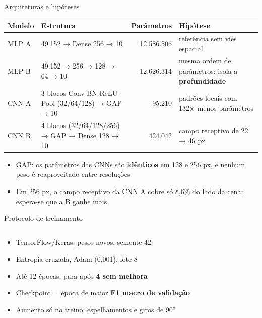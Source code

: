 \documentclass[aspectratio=169,10pt,t]{beamer}
\begin{document}
\begin{frame}{Arquiteturas e hipóteses}
\small
\begin{tabularx}{\linewidth}{@{}lLrL@{}}
\toprule
Modelo & Estrutura & Parâmetros & Hipótese\\
\midrule
MLP A & 49.152 → Dense 256 → 10 & 12.586.506 & referência sem viés espacial\\
MLP B & 49.152 → 256 → 128 → 64 → 10 & 12.626.314 & mesma ordem de parâmetros: isola a \textbf{profundidade}\\
CNN A & 3 blocos Conv-BN-ReLU-Pool (32/64/128) → GAP → 10 & 95.210 & padrões locais com 132× menos parâmetros\\
CNN B & 4 blocos (32/64/128/256) → GAP → Dense 128 → 10 & 424.042 & campo receptivo de 22 → 46 px\\
\bottomrule
\end{tabularx}
\vskip4mm
\begin{itemize}
\item GAP: os parâmetros das CNNs são \textbf{idênticos} em 128 e 256 px, e nenhum peso é reaproveitado entre resoluções
\item Em 256 px, o campo receptivo da CNN A cobre só 8,6\% do lado da cena; espera-se que a B ganhe mais
\end{itemize}
\end{frame}

\begin{frame}{Protocolo de treinamento}
\begin{columns}[T]
\begin{column}{0.5\textwidth}
\begin{itemize}
\item TensorFlow/Keras, pesos novos, semente 42
\item Entropia cruzada, Adam (0,001), lote 8
\item Até 12 épocas; para após \textbf{4 sem melhora}
\item Checkpoint = época de maior \textbf{F1 macro de validação}
\item Aumento só no treino: espelhamentos e giros de 90°
\end{itemize}
\end{column}
\begin{column}{0.46\textwidth}
\vskip3mm
\end{column}
\end{columns}
\end{frame}
\end{document}
